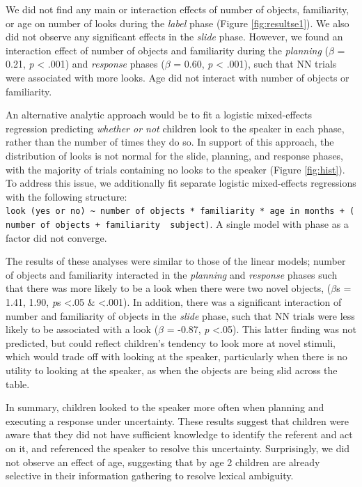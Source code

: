 \documentclass[english,man]{apa6}
\theoremstyle{definition}
\theoremstyle{definition}
\theoremstyle{definition}
\theoremstyle{remark}
\begin{document}
We did not find any main or interaction effects of number of objects,
familiarity, or age on number of looks during the \emph{label} phase
(Figure \ref{fig:resultse1}). We also did not observe any significant
effects in the \emph{slide} phase. However, we found an interaction
effect of number of objects and familiarity during the \emph{planning}
(\(\beta\) = 0.21, \emph{p} \textless{} .001) and \emph{response} phases
(\(\beta\) = 0.60, \emph{p} \textless{} .001), such that NN trials were
associated with more looks. Age did not interact with number of objects
or familiarity.

An alternative analytic approach would be to fit a logistic
mixed-effects regression predicting \emph{whether or not} children look
to the speaker in each phase, rather than the number of times they do
so. In support of this approach, the distribution of looks is not normal
for the slide, planning, and response phases, with the majority of
trials containing no looks to the speaker (Figure \ref{fig:hist}). To
address this issue, we additionally fit separate logistic mixed-effects
regressions with the following structure:
\texttt{look\ (yes\ or\ no)\ \textasciitilde{}\ number\ of\ objects\ *\ familiarity\ *\ age\ in\ months\ +\ (number\ of\ objects\ +\ familiarity\ \textbar{}\ subject)}.
A single model with phase as a factor did not converge.

The results of these analyses were similar to those of the linear
models; number of objects and familiarity interacted in the
\emph{planning} and \emph{response} phases such that there was more
likely to be a look when there were two novel objects, (\(\beta\)s =
1.41, 1.90, \emph{p}s \textless{}.05 \& \textless{}.001). In addition,
there was a significant interaction of number and familiarity of objects
in the \emph{slide} phase, such that NN trials were less likely to be
associated with a look (\(\beta\) = -0.87, \emph{p} \textless{}.05).
This latter finding was not predicted, but could reflect children's
tendency to look more at novel stimuli, which would trade off with
looking at the speaker, particularly when there is no utility to looking
at the speaker, as when the objects are being slid across the table.

In summary, children looked to the speaker more often when planning and
executing a response under uncertainty. These results suggest that
children were aware that they did not have sufficient knowledge to
identify the referent and act on it, and referenced the speaker to
resolve this uncertainty. Surprisingly, we did not observe an effect of
age, suggesting that by age 2 children are already selective in their
information gathering to resolve lexical ambiguity.
\end{document}
